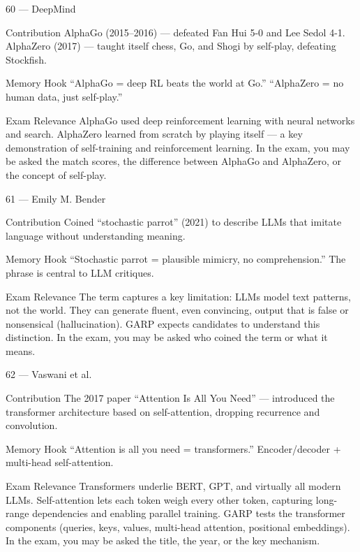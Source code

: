 \documentclass[aspectratio=169,8pt]{beamer}
\begin{document}
	\begin{frame}{60 --- DeepMind}
		\begin{block}{Contribution}
			AlphaGo (2015--2016) --- defeated Fan Hui 5-0 and Lee Sedol 4-1. AlphaZero (2017) --- taught itself chess, Go, and Shogi by self-play, defeating Stockfish.
		\end{block}
		\begin{block}{Memory Hook}
			``AlphaGo = deep RL beats the world at Go.'' ``AlphaZero = no human data, just self-play.''
		\end{block}
		\begin{block}{Exam Relevance}
			AlphaGo used deep reinforcement learning with neural networks and search. AlphaZero learned from scratch by playing itself --- a key demonstration of self-training and reinforcement learning. In the exam, you may be asked the match scores, the difference between AlphaGo and AlphaZero, or the concept of self-play.
		\end{block}
	\end{frame}
	
	\begin{frame}{61 --- Emily M. Bender}
		\begin{block}{Contribution}
			Coined ``stochastic parrot'' (2021) to describe LLMs that imitate language without understanding meaning.
		\end{block}
		\begin{block}{Memory Hook}
			``Stochastic parrot = plausible mimicry, no comprehension.'' The phrase is central to LLM critiques.
		\end{block}
		\begin{block}{Exam Relevance}
			The term captures a key limitation: LLMs model text patterns, not the world. They can generate fluent, even convincing, output that is false or nonsensical (hallucination). GARP expects candidates to understand this distinction. In the exam, you may be asked who coined the term or what it means.
		\end{block}
	\end{frame}
	
	\begin{frame}{62 --- Vaswani et al.}
		\begin{block}{Contribution}
			The 2017 paper ``Attention Is All You Need'' --- introduced the transformer architecture based on self-attention, dropping recurrence and convolution.
		\end{block}
		\begin{block}{Memory Hook}
			``Attention is all you need = transformers.'' Encoder/decoder + multi-head self-attention.
		\end{block}
		\begin{block}{Exam Relevance}
			Transformers underlie BERT, GPT, and virtually all modern LLMs. Self-attention lets each token weigh every other token, capturing long-range dependencies and enabling parallel training. GARP tests the transformer components (queries, keys, values, multi-head attention, positional embeddings). In the exam, you may be asked the title, the year, or the key mechanism.
		\end{block}
	\end{frame}
	
\end{document}
